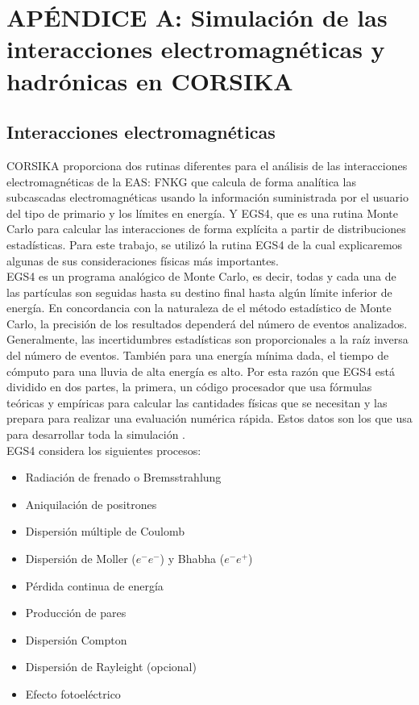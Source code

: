 \newpage
\chapter{APÉNDICE A: Simulación de las interacciones electromagnéticas y hadrónicas en CORSIKA}
\label{sec:apendiceA}

\section{Interacciones electromagn\'eticas}

CORSIKA proporciona dos rutinas diferentes para el análisis de las interacciones electromagnéticas de la EAS: FNKG que calcula de forma analítica las subcascadas electromagnéticas usando la información suministrada por el usuario del tipo de primario y los límites en energía. Y EGS4, que es una rutina Monte Carlo para calcular las interacciones de forma explícita a partir de distribuciones estadísticas. Para este trabajo, se utilizó la rutina EGS4 de la cual explicaremos algunas de sus consideraciones físicas más importantes.\\

EGS4 es un programa analógico de Monte Carlo, es decir, todas y cada una de las partículas son seguidas hasta su destino final hasta algún límite inferior de energía. En concordancia con la naturaleza de el método estadístico de Monte Carlo, la precisión de los resultados dependerá del número de eventos analizados. Generalmente, las incertidumbres estadísticas son proporcionales a la raíz inversa del número de eventos\cite{EGS4}. También para una energía mínima dada, el tiempo de cómputo para una lluvia de alta energía es alto. Por esta razón que EGS4 está dividido en dos partes, la primera, un código procesador que usa fórmulas teóricas y empíricas para calcular las cantidades físicas que se necesitan y las prepara para realizar una evaluación numérica rápida. Estos datos son los que usa para desarrollar toda la simulación \cite{EGS4}.\\

EGS4 considera los siguientes procesos:

\begin{itemize}
    \item Radiación de frenado o Bremsstrahlung
    \item Aniquilación de positrones
    \item Dispersión múltiple de Coulomb
    \item Dispersión de Moller ($e^{-}e^{-}$) y Bhabha ($e^{-}e^{+}$)
    \item Pérdida continua de energía
    \item Producción de pares
    \item Dispersión Compton
    \item Dispersión de Rayleight (opcional)
    \item Efecto fotoeléctrico
\end{itemize}{}


